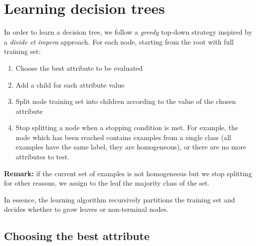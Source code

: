 \section{Learning decision trees}
In order to learn a decision tree, we follow a \textit{greedy} top-down strategy inspired by a \textit{divide et impera} approach. For each node, starting from the root with full training set:
\begin{enumerate}
    \item Choose the best attribute to be evaluated
    \item Add a child for each attribute value
    \item Split node training set into children according to the value of the chosen attribute
    \item Stop splitting a node when a stopping condition is met. For example, the node which has been reached contains examples from a single class (all examples have the same label, they are homogeneous), or there are no more attributes to test.
\end{enumerate}

\textbf{Remark:} if the current set of examples is not homogeneous but we stop splitting for other reasons, we assign to the leaf the majority class of the set. \newline

In essence, the learning algorithm recursively partitions the training set and decides whether to grow leaves or non-terminal nodes.

\subsection{Choosing the best attribute}


